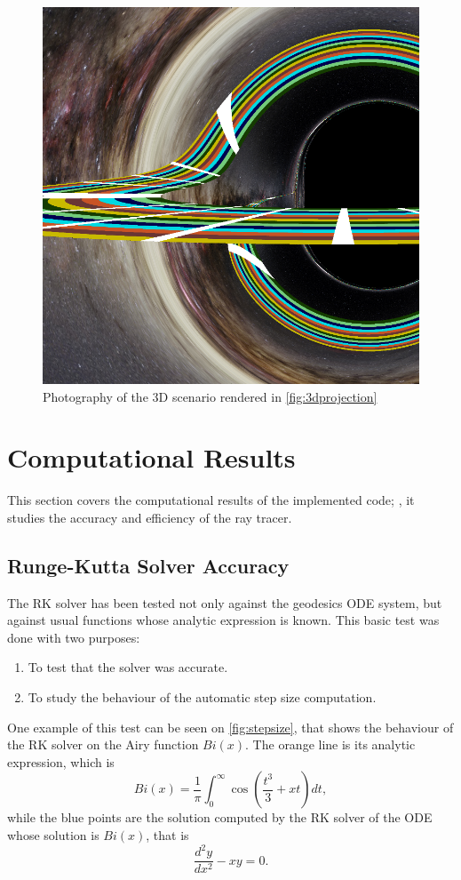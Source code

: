 \begin{figure}[bth]
	\myfloatalign
	\includegraphics[width=.7\linewidth]{gfx/3d_01_image}
	\caption[Photography from a 3D scenario]{Photography of the 3D scenario rendered in \autoref{fig:3dprojection}}
	\label{fig:3dprojectionimage}
\end{figure}

\section{Computational Results}

This section covers the computational results of the implemented code; \ie, it studies the accuracy and efficiency of the ray tracer.

\subsection{Runge-Kutta Solver Accuracy}

The \ac{RK} solver has been tested not only against the geodesics \ac{ODE} system, but against usual functions whose analytic expression is known. This basic test was done with two purposes:
\begin{enumerate}
	\item To test that the solver was accurate.
	\item To study the behaviour of the automatic step size computation.
\end{enumerate}

One example of this test can be seen on \autoref{fig:stepsize}, that shows the behaviour of the \ac{RK} solver on the Airy function $Bi(x)$. The orange line is its analytic expression, which is
\[
	Bi(x) = \frac{1}{\pi} \int_0^\infty \cos\left(\frac{t^3}{3} + xt\right)dt,
\]
while the blue points are the solution computed by the \ac{RK} solver of the \ac{ODE} whose solution is $Bi(x)$, that is
\[
	\frac{d^2y}{dx^2} - xy = 0.
\]

